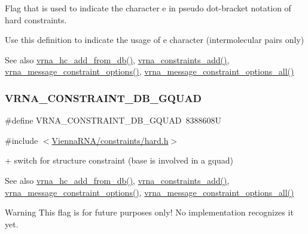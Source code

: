 Flag that is used to indicate the character \textquotesingle{}e\textquotesingle{} in pseudo dot-\/bracket notation of hard constraints. 

Use this definition to indicate the usage of \textquotesingle{}e\textquotesingle{} character (intermolecular pairs only)

\begin{DoxySeeAlso}{See also}
\mbox{\hyperlink{group__hard__constraints_ga5b4de3247b67358080c176b94591a8e6}{vrna\+\_\+hc\+\_\+add\+\_\+from\+\_\+db()}}, \mbox{\hyperlink{group__constraints_ga35a401f680969a556858a8dd5f1d07cc}{vrna\+\_\+constraints\+\_\+add()}}, \mbox{\hyperlink{group__constraints_gaa1f20b53bf09ac2e6b0dbb13f7d89670}{vrna\+\_\+message\+\_\+constraint\+\_\+options()}}, \mbox{\hyperlink{group__constraints_gaec7e13fa0465c2acc7a621d1aecb709f}{vrna\+\_\+message\+\_\+constraint\+\_\+options\+\_\+all()}} 
\end{DoxySeeAlso}
\mbox{\label{group__hard__constraints_ga75cfab03cdc97c95b3ce8bb29f52b08e}} 
\subsubsection{\texorpdfstring{VRNA\_CONSTRAINT\_DB\_GQUAD}{VRNA\_CONSTRAINT\_DB\_GQUAD}}
{\footnotesize\ttfamily \#define V\+R\+N\+A\+\_\+\+C\+O\+N\+S\+T\+R\+A\+I\+N\+T\+\_\+\+D\+B\+\_\+\+G\+Q\+U\+AD~8388608U}



{\ttfamily \#include $<$\mbox{\hyperlink{hard_8h}{Vienna\+R\+N\+A/constraints/hard.\+h}}$>$}



\textquotesingle{}+\textquotesingle{} switch for structure constraint (base is involved in a gquad) 

\begin{DoxySeeAlso}{See also}
\mbox{\hyperlink{group__hard__constraints_ga5b4de3247b67358080c176b94591a8e6}{vrna\+\_\+hc\+\_\+add\+\_\+from\+\_\+db()}}, \mbox{\hyperlink{group__constraints_ga35a401f680969a556858a8dd5f1d07cc}{vrna\+\_\+constraints\+\_\+add()}}, \mbox{\hyperlink{group__constraints_gaa1f20b53bf09ac2e6b0dbb13f7d89670}{vrna\+\_\+message\+\_\+constraint\+\_\+options()}}, \mbox{\hyperlink{group__constraints_gaec7e13fa0465c2acc7a621d1aecb709f}{vrna\+\_\+message\+\_\+constraint\+\_\+options\+\_\+all()}}
\end{DoxySeeAlso}
\begin{DoxyWarning}{Warning}
This flag is for future purposes only! No implementation recognizes it yet. 
\end{DoxyWarning}
\mbox{\label{group__hard__constraints_ga10ce6bd2355945f3c8161b7a30a2c322}} 

